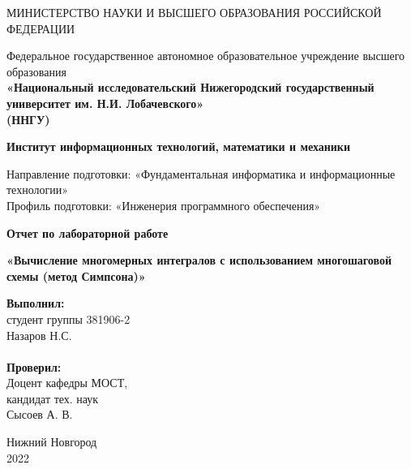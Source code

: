 \documentclass{report}
\begin{document}
\begin{titlepage}

\begin{center}
МИНИСТЕРСТВО НАУКИ И ВЫСШЕГО ОБРАЗОВАНИЯ РОССИЙСКОЙ ФЕДЕРАЦИИ 
\end{center}

\begin{center}
Федеральное государственное автономное образовательное учреждение высшего образования \\
\textbf{«Национальный исследовательский 
Нижегородский государственный университет им. Н.И. Лобачевского» \\
(ННГУ)}
\end{center}
\begin{center}
\textbf{Институт информационных технологий, математики и механики}
\end{center}
\begin{center}
Направление подготовки: «Фундаментальная информатика и информационные технологии»\\
Профиль подготовки: «Инженерия программного обеспечения»
\end{center}

\begin{center}
\textbf{Отчет по лабораторной работе} \\
\end{center}
\begin{center}
\textbf{«Вычисление многомерных интегралов с использованием многошаговой схемы (метод Симпсона)»} \\
\end{center}

\vspace{2em}

\newbox{\lbox}
\newlength{\maxl}
\setlength{\maxl}{\wd\lbox}
\hfill\parbox{7cm}{
\hspace*{5cm}\hspace*{-5cm}\textbf{Выполнил:} \\ студент группы 381906-2 \\ Назаров Н.С.\\
\\
\hspace*{5cm}\hspace*{-5cm}\textbf{Проверил:}\\ Доцент кафедры МОСТ, \\ кандидат тех. наук \\ Сысоев А. В.\\
}
\vspace{\fill}

\begin{center} Нижний Новгород \\ 2022 \end{center}

\end{titlepage}
\end{document}
